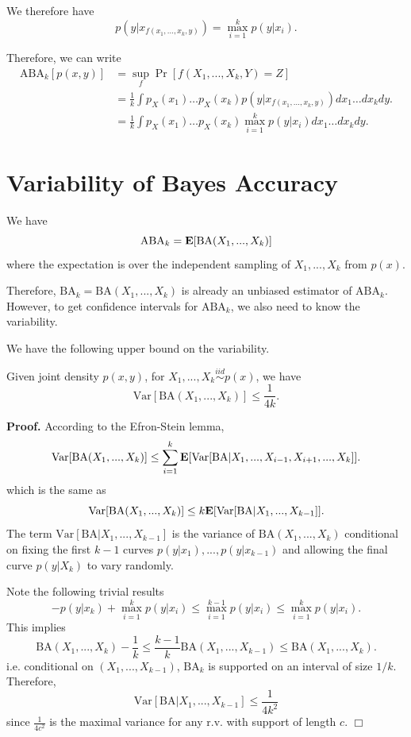 We therefore have
\[
p(y|x_{f(x_1,...,x_k, y)}) = \max_{i=1}^k p(y|x_i).
\]

Therefore, we can write
\begin{align*}
\text{ABA}_k[p(x, y)] &= \sup_f \Pr[f(X_1,...,X_k, Y) = Z]
\\&=  \frac{1}{k} \int p_X(x_1)\hdots p_X(x_k) p(y|x_{f(x_1,...,x_k, y)})  dx_1\hdots dx_k dy.
\\&=  \frac{1}{k} \int p_X(x_1)\hdots p_X(x_k) \max_{i=1}^k p(y|x_i)  dx_1\hdots dx_k dy.
\end{align*}

\section{Variability of Bayes Accuracy}
We have
\[
\text{ABA}_k = \textbf{E}[\text{BA}(X_1,...,X_k)]
\]
where the expectation is over the independent sampling of $X_1,...,X_k$ from $p(x)$.

Therefore, $\text{BA}_k = \text{BA}(X_1,...,X_k)$ is already an
unbiased estimator of $\text{ABA}_k$.  However, to get confidence
intervals for $\text{ABA}_k$, we also need to know the variability.

We have the following upper bound on the variability.

\begin{theorem}
Given joint density $p(x, y)$, for $X_1,...,X_k \stackrel{iid}{\sim} p(x)$, we have
\[
\text{Var}[\text{BA}(X_1,...,X_k)] \leq \frac{1}{4k}.
\]
\end{theorem}

\noindent\textbf{Proof.}
According to the Efron-Stein lemma,
\[
\text{Var}[\text{BA}(X_1,...,X_k)] \leq \sum_{i=1}^k \textbf{E}[\text{Var}[\text{BA}|X_1,...,X_{i-1}, X_{i+1}, ..., X_k]].
\]
which is the same as
\[
\text{Var}[\text{BA}(X_1,...,X_k)] \leq k \textbf{E}[\text{Var}[\text{BA}|X_1,...,X_{k-1}]].
\]
The term $\text{Var}[\text{BA}|X_1,...,X_{k-1}]$ is the variance of $\text{BA}(X_1,...,X_k)$
conditional on fixing the first $k-1$ curves $p(y|x_1),...,p(y|x_{k-1})$ and allowing the final curve $p(y|X_k)$ to vary randomly.

Note the following trivial results
\[
-p(y|x_k) + \max_{i=1}^k p(y|x_i)\leq \max_{i=1}^{k-1} p(y|x_i) \leq \max_{i=1}^k p(y|x_i).
\]
This implies
\[
\text{BA}(X_1,...,X_k) - \frac{1}{k} \leq \frac{k-1}{k}\text{BA}(X_1,...,X_{k-1}) \leq \text{BA}(X_1,...,X_k).
\]
i.e. conditional on $(X_1,...,X_{k-1})$, $\text{BA}_k$ is supported on an interval of size $1/k$.
Therefore,
\[
\text{Var}[\text{BA}|X_1,...,X_{k-1}] \leq \frac{1}{4k^2}
\]
since $\frac{1}{4c^2}$ is the maximal variance for any r.v. with support of length $c$. $\Box$

